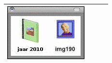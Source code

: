 \documentclass[12pt]{article}
\begin{document}
\begin{minipage}{\textwidth}
\begin{table}[H]
\begin{tabulary}{\linewidth}{|C|C|C|C|}
					\includegraphics[width=\linewidth]{option4} \\
					\hline 
				\end{tabulary}
			\end{table}
	\end{minipage} \\ \\
	
\end{document}

